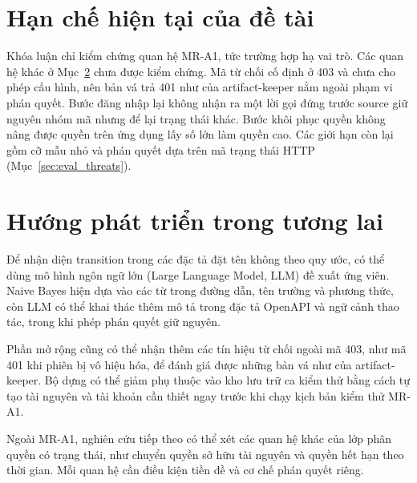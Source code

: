 \section{Hạn chế hiện tại của đề tài}
\label{sec:conclusion_limitations}

Khóa luận chỉ kiểm chứng quan hệ MR-A1, tức trường hợp hạ vai trò. Các quan hệ khác ở Mục~\ref{sec:conclusion_future_work} chưa được kiểm chứng. Mã từ chối cố định ở 403 và chưa cho phép cấu hình, nên bản vá trả 401 như của artifact-keeper nằm ngoài phạm vi phán quyết. Bước đăng nhập lại không nhận ra một lời gọi đứng trước source giữ nguyên nhóm mã nhưng để lại trạng thái khác. Bước khôi phục quyền không nâng được quyền trên ứng dụng lấy số lớn làm quyền cao. Các giới hạn còn lại gồm cỡ mẫu nhỏ và phán quyết dựa trên mã trạng thái HTTP (Mục~\ref{sec:eval_threats}).

\section{Hướng phát triển trong tương lai}
\label{sec:conclusion_future_work}

Để nhận diện transition trong các đặc tả đặt tên không theo quy ước, có thể dùng mô hình ngôn ngữ lớn (Large Language Model, LLM) đề xuất ứng viên. Naive Bayes hiện dựa vào các từ trong đường dẫn, tên trường và phương thức, còn LLM có thể khai thác thêm mô tả trong đặc tả OpenAPI và ngữ cảnh thao tác, trong khi phép phán quyết giữ nguyên.

Phần mở rộng cũng có thể nhận thêm các tín hiệu từ chối ngoài mã 403, như mã 401 khi phiên bị vô hiệu hóa, để đánh giá được những bản vá như của artifact-keeper. Bộ dựng có thể giảm phụ thuộc vào kho lưu trữ ca kiểm thử bằng cách tự tạo tài nguyên và tài khoản cần thiết ngay trước khi chạy kịch bản kiểm thử MR-A1.

Ngoài MR-A1, nghiên cứu tiếp theo có thể xét các quan hệ khác của lớp phân quyền có trạng thái, như chuyển quyền sở hữu tài nguyên và quyền hết hạn theo thời gian. Mỗi quan hệ cần điều kiện tiền đề và cơ chế phán quyết riêng.
